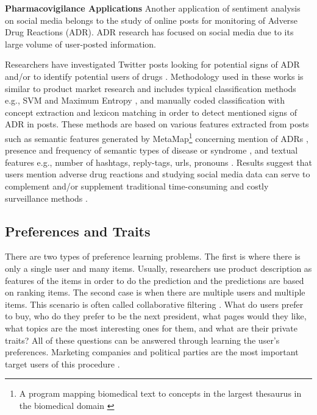 \documentclass[11pt,a4paper]{article}
\begin{document}
\textbf{Pharmacovigilance Applications}
Another application of sentiment analysis on social media belongs to the study of online posts for monitoring of Adverse Drug Reactions (ADR). ADR research has focused on social media due to its large volume of user-posted information.

Researchers have investigated Twitter posts looking for potential signs of ADR \cite{jiang, oconnor} and/or to identify potential users of drugs \cite{bian}. Methodology used in these works is similar to product market research and includes typical classification methods e.g., SVM and Maximum Entropy \cite{jiang, bian}, and manually coded classification with concept extraction and lexicon matching \cite{oconnor} in order to detect mentioned signs of ADR in posts. These methods are based on various features extracted from posts such as semantic features generated by MetaMap\footnote{A program mapping biomedical text to concepts in the largest thesaurus in the biomedical domain \cite{aronson}} concerning mention of ADRs \cite{oconnor, jiang, bian}, presence and frequency of semantic types of disease or syndrome \cite{jiang}, and textual features e.g., number of hashtags, reply-tags, urls, pronouns \cite{jiang, bian}. Results suggest that users mention adverse drug reactions and studying social media data can serve to complement and/or supplement traditional time-consuming and costly surveillance methods \cite{jiang}.

\subsection{Preferences and Traits}
There are two types of preference learning problems. The first is where there is only a single user and many items. Usually, researchers use product description as features of the items in order to do the prediction and the predictions are based on ranking items. The second case is when there are multiple users and multiple items. This scenario is often called collaborative filtering \cite{hullermeier}. What do users prefer to buy, who do they prefer to be the next president, what pages would they like, what topics are the most interesting ones for them, and what are their private traits? All of these questions can be answered through learning the user's preferences. Marketing companies and political parties are the most important target users of this procedure .
\end{document}
